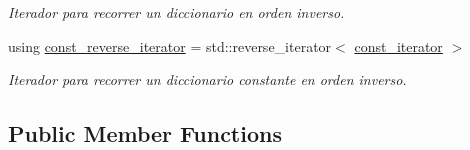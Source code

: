 \begin{DoxyCompactItemize}
\begin{DoxyCompactList}\small\item\em Iterador para recorrer un diccionario en orden inverso. \end{DoxyCompactList}\item 
using \hyperlink{classaed2_1_1map_aed66a216549d13078a3ea6978ea0b768}{const\+\_\+reverse\+\_\+iterator} = std\+::reverse\+\_\+iterator$<$ \hyperlink{classaed2_1_1map_1_1const__iterator}{const\+\_\+iterator} $>$
\begin{DoxyCompactList}\small\item\em Iterador para recorrer un diccionario constante en orden inverso. \end{DoxyCompactList}\end{DoxyCompactItemize}
\subsection*{Public Member Functions}
